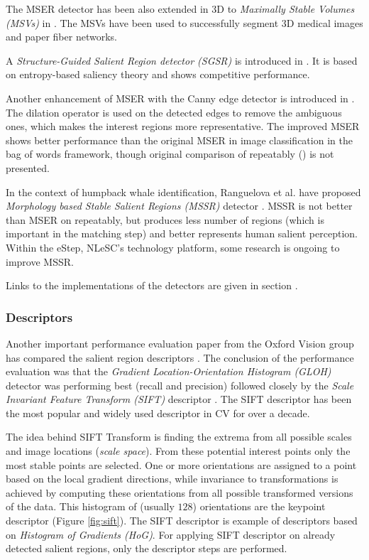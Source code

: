 The MSER detector has been also extended in 3D to {\em Maximally Stable Volumes (MSVs)} in \cite{DonoserB06}. The MSVs have been used to successfully segment 3D medical images and paper fiber networks.

A {\em Structure-Guided Salient Region detector (SGSR)} is introduced in \cite{Fan08}. It is based on entropy-based saliency theory and shows competitive performance.

Another enhancement of MSER with the Canny edge detector is introduced in \cite{Wang14}. The dilation operator is used on the detected edges to remove the ambiguous ones, which makes the interest regions more representative. The improved MSER shows better performance than the original MSER in image classification in the bag of words framework, though original comparison of repeatably (\cite{Mikolajczyk:2005}) is not presented. 

In the context of humpback whale identification, Ranguelova et al. have proposed {\em Morphology based Stable Salient Regions (MSSR)} detector \cite{RangMSSR06, RangHumpb06} . MSSR is not better than MSER on repeatably, but produces less number of regions (which is important in the matching step) and better represents human salient perception. Within the eStep, NLeSC's technology platform, some research is ongoing to improve MSSR.

Links to the implementations of the detectors are given in section .

\subsubsection{Descriptors}
Another important performance evaluation paper from the Oxford Vision group has compared the salient region descriptors \cite{MS05}. The conclusion of the performance evaluation was that the {\em Gradient Location-Orientation Histogram (GLOH)} detector was performing best (recall and precision) followed closely by the {\em Scale Invariant Feature Transform (SIFT)} descriptor \cite{Lowe:2004}. The SIFT descriptor has been the most popular and widely used descriptor in CV for over a decade. 

The idea behind SIFT Transform is finding the extrema from all possible scales and image locations ({\em scale space}). From these potential interest points only the most stable points are selected. One or more orientations are assigned to a point based on the local gradient directions, while invariance to transformations is achieved by computing these orientations from all possible transformed versions of the data.  This histogram of (usually $128$) orientations are the keypoint descriptor (Figure \ref{fig:sift}). The SIFT descriptor is example of descriptors based on {\em Histogram of Gradients (HoG)}. For applying SIFT descriptor on already detected salient regions, only the descriptor steps are performed. 

